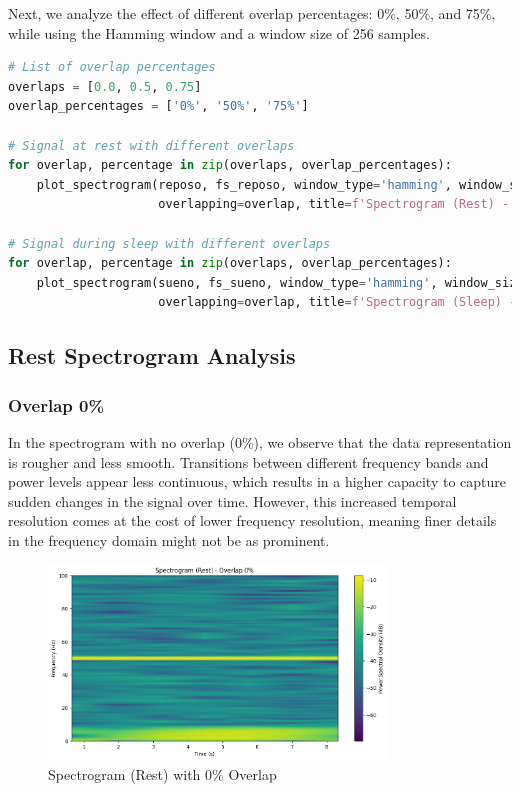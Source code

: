 \documentclass[10pt]{article}
\theoremstyle{definition}
\theoremstyle{remark}
\theoremstyle{definition}
\numberwithin{equation}{prob}
\begin{document}
Next, we analyze the effect of different overlap percentages: 0\%, 50\%, and 75\%, while using the Hamming window and a window size of 256 samples.



\begin{lstlisting}[language=Python]
# List of overlap percentages
overlaps = [0.0, 0.5, 0.75]
overlap_percentages = ['0%', '50%', '75%']

# Signal at rest with different overlaps
for overlap, percentage in zip(overlaps, overlap_percentages):
    plot_spectrogram(reposo, fs_reposo, window_type='hamming', window_size=256,
                     overlapping=overlap, title=f'Spectrogram (Rest) - Overlap {percentage}')

# Signal during sleep with different overlaps
for overlap, percentage in zip(overlaps, overlap_percentages):
    plot_spectrogram(sueno, fs_sueno, window_type='hamming', window_size=256,
                     overlapping=overlap, title=f'Spectrogram (Sleep) - Overlap {percentage}')
\end{lstlisting}

\subsection{Rest Spectrogram Analysis}

\subsubsection{Overlap 0\%}
In the spectrogram with no overlap (0\%), we observe that the data representation is rougher and less smooth. Transitions between different frequency bands and power levels appear less continuous, which results in a higher capacity to capture sudden changes in the signal over time. However, this increased temporal resolution comes at the cost of lower frequency resolution, meaning finer details in the frequency domain might not be as prominent.

\begin{figure}[H]
    \centering
    \includegraphics[width=0.8\textwidth]{./figures/Spectrogram Rest Overlap 0.png}
    \caption{Spectrogram (Rest) with 0\% Overlap}
    \label{fig:rest_0_overlap}
\end{figure}
\end{document}
